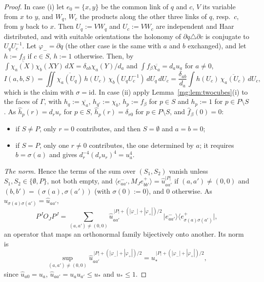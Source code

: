 \documentclass[11pt,a4paper]{article}
\theoremstyle{definition}
\theoremstyle{remark}
\begin{document}
\begin{proof}
In case (i) let $e_0=\{x,y\}$ be the common link of $q$ and $c$, $V$ its variable from $x$ to $y$, and $W_q$, $W_c$ the products along the other three links of $q$, resp.\
$c$, from $y$ back to $x$. Then $U_q:=VW_q$ and $U_c:=VW_c$ are independent and Haar distributed, and with suitable orientations the holonomy of
$\partial q\triangle\partial c$ is conjugate to $U_qU_c^{-1}$. Let $\varphi_-=\partial q$ (the other case is the same with $a$ and $b$ exchanged), and let $h:=f_\beta$ if $c\in S$, $h:=1$
otherwise. Then, by $\int\overline{\chi_a(X)}\chi_b(XY)\,dX=\delta_{ab}\chi_a(Y)/d_a$ and $\int f_\beta\overline{\chi_a}=d_au_a$ for $a\ne0$,
\[
I(a,b,S)=\iint\overline{\chi_a(U_q)}\,h(U_c)\,\chi_b(U_qU_c^{-1})\,dU_q\,dU_c=\frac{\delta_{ab}}{d_a}\int h(U_c)\,\overline{\chi_a(U_c)}\,dU_c ,
\]
which is the claim with $\sigma=\mathrm{id}$. In case (ii) apply Lemma~\ref{mg:lem:twocubes}(i) to the faces of $\Gamma$, with $h_q:=\overline{\chi_a}$, $h_{q'}:=\chi_b$, $h_p:=f_\beta$ for
$p\in S$ and $h_p:=1$ for $p\in P\setminus S$. As $\hat h_p(r)=d_ru_r$ for $p\in S$, $\hat h_p(r)=\delta_{r0}$ for $p\in P\setminus S$, and $\hat f_\beta(0)=0$:
\begin{itemize}
\item if $S\ne P$, only $r=0$ contributes, and then $S=\emptyset$ and $a=b=0$;
\item if $S=P$, only one $r\ne0$ contributes, the one determined by $a$; it requires $b=\sigma(a)$ and gives $d_r^{-4}(d_ru_r)^4=u_a^4$.
\end{itemize}

\emph{The norm.} Hence the terms of the sum over $(S_1,S_2)$ vanish unless $S_1,S_2\in\{\emptyset,P\}$, not both empty, and
$\langle e^-_{aa'},M_Je^+_{bb'}\rangle=\hat u_{aa'}^{|P|}$ if $(a,a')\ne(0,0)$ and $(b,b')=(\sigma(a),\sigma(a'))$ (with $\sigma(0):=0$), and $0$ otherwise. As
$\hat u_{\sigma(a)\sigma(a')}=\hat u_{aa'}$,
\[
P^JO_JP^J=\sum_{(a,a')\ne(0,0)}\hat u_{aa'}^{\,|P|+(|\varphi_-|+|\varphi_+|)/2}\,\bigl|e^-_{aa'}\bigr\rangle\bigl\langle e^+_{\sigma(a)\sigma(a')}\bigr| ,
\]
an operator that maps an orthonormal family bijectively onto another. Its norm is
\[
\sup_{(a,a')\ne(0,0)}\hat u_{aa'}^{\,|P|+(|\varphi_-|+|\varphi_+|)/2}=u_*^{\,|P|+(|\varphi_-|+|\varphi_+|)/2},
\]
since $\hat u_{a0}=u_a$, $\hat u_{aa'}=u_au_{a'}\le u_*$ and $u_*\le1$.
\end{proof}
\end{document}

